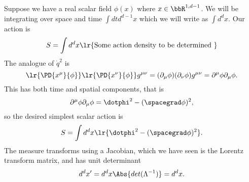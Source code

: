 Suppose we have a real scalar field \( \phi(x) \) where \( x \in \bbR^{1,d-1} \).  We will be integrating over space and time \( \int dt d^{d-1} x \) which we will write as \( \int d^d x \).  Our action is
\begin{dmath}\label{eqn:qftLecture3:400}
S = \int d^d x \lr{ \text{Some action density to be determined } }
\end{dmath}
The analogue of \( \dot{q}^2 \) is
\begin{dmath}\label{eqn:qftLecture3:420}
\lr{ \PD{x^\mu}{\phi} }
\lr{ \PD{x^\nu}{\phi} }
g^{\mu\nu}
=
(\partial_\mu \phi) (\partial_\nu \phi) g^{\mu\nu}
= \partial^\mu \phi \partial_\mu \phi.
\end{dmath}
This has both time and spatial components, that is
\begin{dmath}\label{eqn:qftLecture3:440}
\partial^\mu \phi \partial_\mu \phi =
\dotphi^2 - (\spacegrad \phi)^2,
\end{dmath}
so the desired simplest scalar action is
\begin{dmath}\label{eqn:qftLecture3:460}
S = \int d^d x \lr{ \dotphi^2 - (\spacegrad \phi)^2 }.
\end{dmath}
The measure transforms using a Jacobian, which we have seen is the Lorentz transform matrix, and has unit determinant
\begin{equation}\label{eqn:qftLecture3:480}
d^d x' = d^d x \Abs{ det( \Lambda^{-1} ) } = d^d x.
\end{equation}


